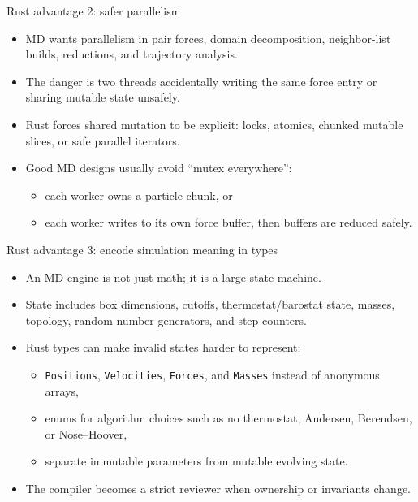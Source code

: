 \documentclass[aspectratio=169]{beamer}
\begin{document}
\begin{frame}{Rust advantage 2: safer parallelism}
\begin{itemize}
  \item MD wants parallelism in pair forces, domain decomposition, neighbor-list builds, reductions, and trajectory analysis.
  \item The danger is two threads accidentally writing the same force entry or sharing mutable state unsafely.
  \item Rust forces shared mutation to be explicit: locks, atomics, chunked mutable slices, or safe parallel iterators.
  \item Good MD designs usually avoid ``mutex everywhere'':
  \begin{itemize}
    \item each worker owns a particle chunk, or
    \item each worker writes to its own force buffer, then buffers are reduced safely.
  \end{itemize}
\end{itemize}
\end{frame}

\begin{frame}{Rust advantage 3: encode simulation meaning in types}
\begin{itemize}
  \item An MD engine is not just math; it is a large state machine.
  \item State includes box dimensions, cutoffs, thermostat/barostat state, masses, topology, random-number generators, and step counters.
  \item Rust types can make invalid states harder to represent:
  \begin{itemize}
    \item \texttt{Positions}, \texttt{Velocities}, \texttt{Forces}, and \texttt{Masses} instead of anonymous arrays,
    \item enums for algorithm choices such as no thermostat, Andersen, Berendsen, or Nose--Hoover,
    \item separate immutable parameters from mutable evolving state.
  \end{itemize}
  \item The compiler becomes a strict reviewer when ownership or invariants change.
\end{itemize}
\end{frame}
\end{document}
